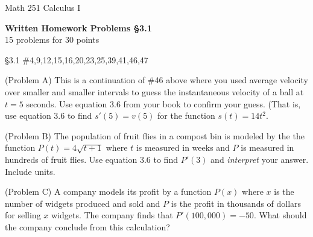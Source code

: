 \documentclass[11pt]{report}
\theoremstyle{plain}
\begin{document}
\hfill Math 251 Calculus I
\begin{center}
\Large{\textbf{Written Homework Problems \S 3.1}} \\
15 problems for 30 points\\
\end{center}

\begin{description}
\item{\S 3.1} \#4,9,12,15,16,20,23,25,39,41,46,47

\item{(Problem A)} This is a continuation of \#46 above where you used average velocity over smaller and smaller intervals to guess the instantaneous velocity of a ball at $t=5$ seconds. Use equation 3.6 from your book to confirm your guess. (That is, use equation 3.6 to find $s'(5)=v(5)$ for the function $s(t)=14t^2.$

\item{(Problem B)} The population of fruit flies in a compost bin is modeled by the the function $P(t)=4\sqrt{t+1}$ where $t$ is measured in weeks and $P$ is measured in hundreds of fruit flies. Use equation 3.6 to find $P'(3)$ and \emph{interpret} your answer. Include units.

\item{(Problem C)} A company models its profit by a function $P(x)$ where $x$ is the number of widgets produced and sold and $P$ is the profit in thousands of dollars for selling $x$ widgets. The company finds that $P'(100,000)=-50.$ What should the company conclude from this calculation?


\end{description}
\end{document}
